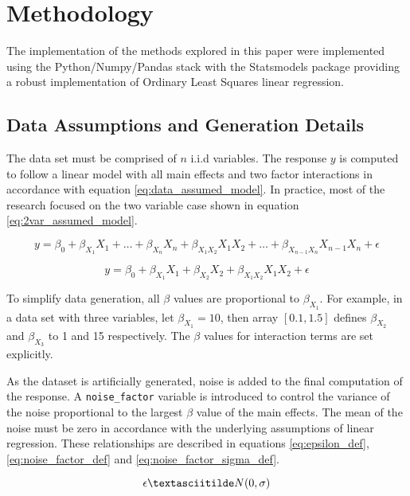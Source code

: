\documentclass[../paper.tex]{subfiles}
\begin{document}
\section{Methodology}
The implementation of the methods explored in this paper were implemented using
the Python/Numpy/Pandas stack with the Statsmodels package providing a robust
implementation of Ordinary Least Squares linear regression.


\subsection{Data Assumptions and Generation Details}
The data set must be comprised of $n$ i.i.d variables. The response $y$ is computed
to follow a linear model with all main effects and two factor interactions
in accordance with equation \ref{eq:data_assumed_model}. In practice, most of
the research focused on the two variable case shown in equation
\ref{eq:2var_assumed_model}.

\begin{equation}\label{eq:data_assumed_model}
  y = \beta_{0} + \beta_{ X_{1} } X_{1}  + \ldots + \beta_{X_{n}}X_{n} +
  \beta_{X_{1}X_{2}}X_{1}X_{2} + \ldots +\beta_{X_{n-1}X_{n}}X_{n-1}X_{n} + \epsilon
\end{equation}


\begin{equation}\label{eq:2var_assumed_model}
  y = \beta_{0} + \beta_{ X_{1}} X_{1} + \beta_{X_{2} }X_{2} +
  \beta_{ X_{1} X_{2} } X_{1}X_{2} + \epsilon
\end{equation}

To simplify data generation, all $\beta$ values are proportional to $\beta_{X_{1}}$.
For example, in a data set with three variables, let $\beta_{X_{1}} = 10$, then array
$[0.1, 1.5]$ defines $\beta_{X_{2}}$ and $\beta_{X_{3}}$ to 1 and 15 respectively.
The $\beta$ values for interaction terms are set explicitly.

As the dataset is artificially generated, noise is added to the final
computation of the response. A \texttt{noise_factor} variable is
introduced to control the variance of the noise proportional
to the largest $\beta$ value of the main effects. The mean of the noise must be
zero in accordance with the underlying assumptions of linear regression. These
relationships are described in equations \ref{eq:epsilon_def},
\ref{eq:noise_factor_def} and \ref{eq:noise_factor_sigma_def}.

\begin{equation}\label{eq:epsilon_def}
  \epsilon \textasciitilde N(0, \sigma)
\end{equation}
\end{document}
